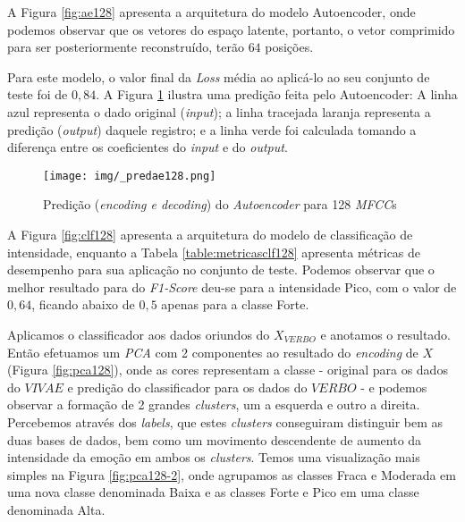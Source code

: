 
A Figura \ref{fig:ae128} apresenta a arquitetura do modelo Autoencoder, onde podemos observar que os vetores do espaço latente, portanto, o vetor comprimido para ser posteriormente reconstruído, terão $64$ posições.

Para este modelo, o valor final da \textit{Loss} média ao aplicá-lo ao seu conjunto de teste foi de $0,84$. A Figura \ref{fig:predae128} ilustra uma predição feita pelo Autoencoder: A linha azul representa o dado original (\textit{input}); a linha tracejada laranja representa a predição (\textit{output}) daquele registro; e a linha verde foi calculada tomando a diferença entre os coeficientes do \textit{input} e do \textit{output}.

    \begin{figure}[t]
    \centering
    \texttt{[image: img/\_predae128.png]}
    \caption{\label{fig:predae128}Predição (\textit{encoding e decoding}) do \textit{Autoencoder} para 128 \textit{MFCC}s}
\end{figure}

A Figura \ref{fig:clf128} apresenta a arquitetura do modelo de classificação de intensidade, enquanto a Tabela \ref{table:metricasclf128} apresenta métricas de desempenho para sua aplicação no conjunto de teste. Podemos observar que o melhor resultado para do \textit{F1-Score} deu-se para a intensidade Pico, com o valor de $0,64$, ficando abaixo de $0,5$ apenas para a classe Forte.

Aplicamos o classificador aos dados oriundos do $X_{VERBO}$ e anotamos o resultado. Então efetuamos um \textit{PCA} com 2 componentes ao resultado do \textit{encoding} de $X$ (Figura \ref{fig:pca128}), onde as cores representam a classe - original para os dados do $VIVAE$ e predição do classificador para os dados do $VERBO$ - e podemos observar a formação de 2 grandes \textit{clusters}, um a esquerda e outro a direita. Percebemos através dos \textit{labels}, que estes \textit{clusters} conseguiram distinguir bem as duas bases de dados, bem como um movimento descendente de aumento da intensidade da emoção em ambos os \textit{clusters}. Temos uma visualização mais simples na Figura \ref{fig:pca128-2}, onde agrupamos as classes Fraca e Moderada em uma nova classe denominada Baixa e as classes Forte e Pico em uma classe denominada Alta.

